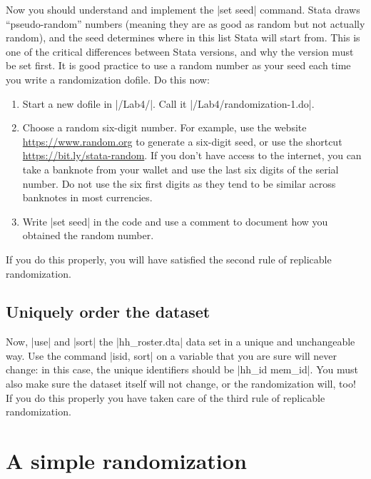 \documentclass{tufte-handout}
\begin{document}
Now you should understand and implement the |set seed| command.
Stata draws ``pseudo-random'' numbers
(meaning they are as good as random but not actually random),
and the seed determines where in this list Stata will start from.
This is one of the critical differences between Stata versions,
and why the version must be set first.
It is good practice to use a random number as your seed
each time you write a randomization dofile. Do this now:
\begin{enumerate}
  \item Start a new dofile in |/Lab4/|. Call it |/Lab4/randomization-1.do|.
  \item Choose a random six-digit number. For example,
  use the website \url{https://www.random.org} to generate a six-digit seed,
  or use the shortcut \url{https://bit.ly/stata-random}.
  If you don't have access to the internet,
  you can take a banknote from your wallet and
  use the last six digits of the serial number.
  Do not use the six first digits as
  they tend to be similar across banknotes in most currencies.
  \item Write |set seed| in the code and
  use a comment to document how you obtained the random number.
\end{enumerate}
If you do this properly, you will have satisfied the
second rule of replicable randomization.

\subsection{Uniquely order the dataset}

Now, |use| and |sort| the |hh_roster.dta| data set
in a unique and unchangeable way.
Use the command |isid, sort| on a variable that you are sure will never change:
in this case, the unique identifiers should be |hh_id mem_id|.
You must also make sure the dataset itself will not change,
or the randomization will, too!
If you do this properly you have taken care of the
third rule of replicable randomization.

\section{A simple randomization}
\end{document}
